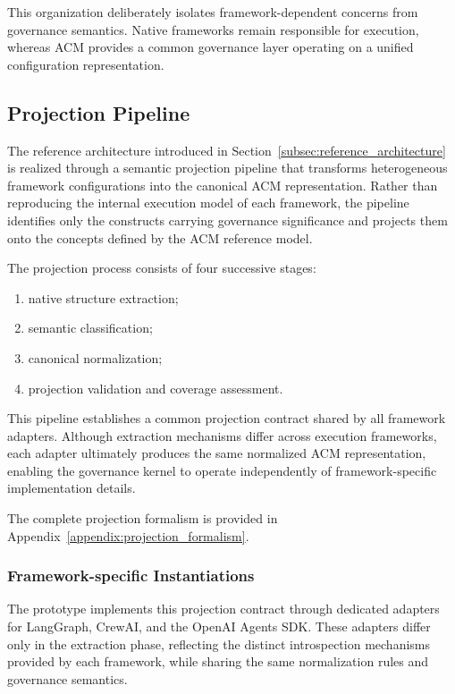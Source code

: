 \documentclass[10pt]{article}
\begin{document}
This organization deliberately isolates framework-dependent concerns from governance semantics. Native frameworks remain responsible for execution, whereas ACM provides a common governance layer operating on a unified configuration representation.


\subsection{Projection Pipeline}
\label{subsec:semantic_projection_pipeline}

The reference architecture introduced in Section~\ref{subsec:reference_architecture} is realized through a semantic projection pipeline that transforms heterogeneous framework configurations into the canonical ACM representation. Rather than reproducing the internal execution model of each framework, the pipeline identifies only the constructs carrying governance significance and projects them onto the concepts defined by the ACM reference model.

The projection process consists of four successive stages:

\begin{enumerate}
	\item native structure extraction;
	\item semantic classification;
	\item canonical normalization;
	\item projection validation and coverage assessment.
\end{enumerate}

This pipeline establishes a common projection contract shared by all framework adapters. Although extraction mechanisms differ across execution frameworks, each adapter ultimately produces the same normalized ACM representation, enabling the governance kernel to operate independently of framework-specific implementation details.

The complete projection formalism is provided in Appendix~\ref{appendix:projection_formalism}.

\subsubsection{Framework-specific Instantiations}

The prototype implements this projection contract through dedicated adapters for LangGraph, CrewAI, and the OpenAI Agents SDK. These adapters differ only in the extraction phase, reflecting the distinct introspection mechanisms provided by each framework, while sharing the same normalization rules and governance semantics.
\end{document}
